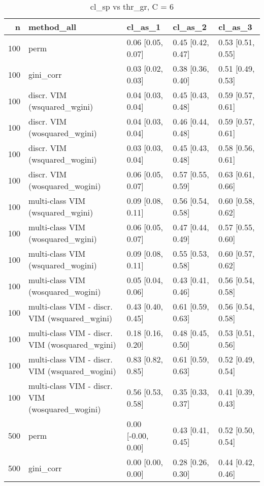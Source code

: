 \begin{table}[ht]
\centering
\caption{cl\_sp vs thr\_gr, C = 6} 
\begin{tabular}{rllll}
  \hline
n & method\_all & cl\_as\_1 & cl\_as\_2 & cl\_as\_3 \\ 
  \hline
100 & perm & 0.06 [0.05, 0.07] & 0.45 [0.42, 0.47] & 0.53 [0.51, 0.55] \\ 
  100 & gini\_corr & 0.03 [0.02, 0.03] & 0.38 [0.36, 0.40] & 0.51 [0.49, 0.53] \\ 
  100 & discr. VIM (wsquared\_wgini) & 0.04 [0.03, 0.04] & 0.45 [0.43, 0.48] & 0.59 [0.57, 0.61] \\ 
  100 & discr. VIM (wosquared\_wgini) & 0.04 [0.03, 0.04] & 0.46 [0.44, 0.48] & 0.59 [0.57, 0.61] \\ 
  100 & discr. VIM (wsquared\_wogini) & 0.03 [0.03, 0.04] & 0.45 [0.43, 0.48] & 0.58 [0.56, 0.61] \\ 
  100 & discr. VIM (wosquared\_wogini) & 0.06 [0.05, 0.07] & 0.57 [0.55, 0.59] & 0.63 [0.61, 0.66] \\ 
  100 & multi-class VIM (wsquared\_wgini) & 0.09 [0.08, 0.11] & 0.56 [0.54, 0.58] & 0.60 [0.58, 0.62] \\ 
  100 & multi-class VIM (wosquared\_wgini) & 0.06 [0.05, 0.07] & 0.47 [0.44, 0.49] & 0.57 [0.55, 0.60] \\ 
  100 & multi-class VIM (wsquared\_wogini) & 0.09 [0.08, 0.11] & 0.55 [0.53, 0.58] & 0.60 [0.57, 0.62] \\ 
  100 & multi-class VIM (wosquared\_wogini) & 0.05 [0.04, 0.06] & 0.43 [0.41, 0.46] & 0.56 [0.54, 0.58] \\ 
  100 & multi-class VIM - discr. VIM (wsquared\_wgini) & 0.43 [0.40, 0.45] & 0.61 [0.59, 0.63] & 0.56 [0.54, 0.58] \\ 
  100 & multi-class VIM - discr. VIM (wosquared\_wgini) & 0.18 [0.16, 0.20] & 0.48 [0.45, 0.50] & 0.53 [0.51, 0.56] \\ 
  100 & multi-class VIM - discr. VIM (wsquared\_wogini) & 0.83 [0.82, 0.85] & 0.61 [0.59, 0.63] & 0.52 [0.49, 0.54] \\ 
  100 & multi-class VIM - discr. VIM (wosquared\_wogini) & 0.56 [0.53, 0.58] & 0.35 [0.33, 0.37] & 0.41 [0.39, 0.43] \\ 
   \hline 500 & perm & 0.00 [-0.00, 0.00] & 0.43 [0.41, 0.45] & 0.52 [0.50, 0.54] \\ 
  500 & gini\_corr & 0.00 [0.00, 0.00] & 0.28 [0.26, 0.30] & 0.44 [0.42, 0.46] \\ 

\end{tabular}
\end{table}
